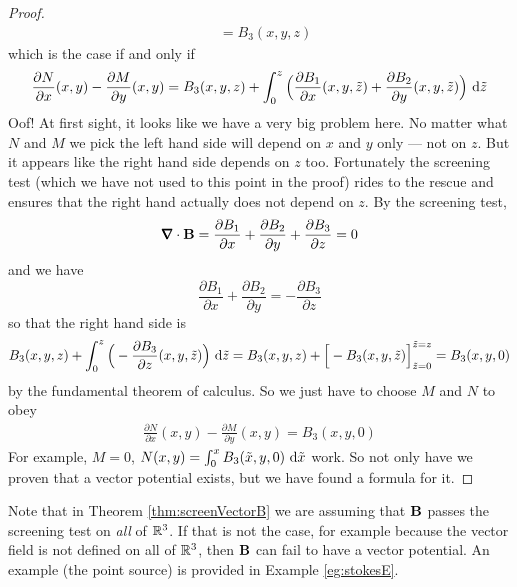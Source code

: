 \begin{proof}
\begin{align*}
&=B_3(x,y,z)
\end{align*}
which is the case if and only if
\begin{align*}
\frac{\partial N}{\partial x}(x,y) -\frac{\partial M}{\partial y}(x,y) =
         B_3(x,y,z) 
         + \int_0^z\Big(\frac{\partial B_1}{\partial x}(x,y,\tilde z) 
         + \frac{\partial B_2}{\partial y}(x,y,\tilde z)\Big)
                            \ \mathrm{d}\tilde z
\end{align*}
Oof! At first sight, it looks like we have a very big problem here.
No matter what $N$ and $M$ we pick the left hand side will depend on $x$ 
and $y$ only --- not on $z$. But it appears like the right hand side
depends on $z$ too. Fortunately the screening test (which we have not used
to this point in the proof) rides to the rescue
and ensures that the right hand actually does not depend on $z$.
By the screening test,
\begin{equation*}
\vnabla\cdot\vB
=\frac{\partial B_1}{\partial x}
+\frac{\partial B_2}{\partial y}
+\frac{\partial B_3}{\partial z}=0
\end{equation*}
and we have
\begin{equation*}
\frac{\partial B_1}{\partial x}
+\frac{\partial B_2}{\partial y}
=-\frac{\partial B_3}{\partial z}
\end{equation*}
so that the right hand side is
\begin{align*}
         B_3(x,y,z) 
        + \int_0^z\Big(-\frac{\partial B_3}{\partial z}(x,y,\tilde z) \Big)
                                        \ \mathrm{d}\tilde z
       = B_3(x,y,z) +\Big[-B_3(x,y,\tilde z)\Big]^{\tilde z=z}_{\tilde z=0}
       =B_3(x,y,0)
\end{align*}
by the fundamental theorem of calculus. So we just have to choose $M$ and $N$ to
obey
\begin{align*}
\frac{\partial N}{\partial x}(x,y) -\frac{\partial M}{\partial y}(x,y) =
         B_3(x,y,0) 
\end{align*}
For example, $M=0$, $N(x,y) = \int _0^x B_3(\tilde x,y,0)\ \dee{\tilde x}$
work. So not only have we proven that a vector potential exists, but we have found a formula for it. 
\end{proof}

\begin{warning}\label{warn:screeningC}
Note that in Theorem \ref{thm:screenVectorB} we are assuming that
$\mathbf{B}$ passes the screening test on \emph{all} of $\mathbb{R}^3$.
If that is not the case, for example
because the vector field is not defined on all of $\mathbb{R}^3$, then 
$\mathbf{B}$ can fail to have a vector potential. An example (the point source)
is provided in Example \ref{eg:stokesE}.
\end{warning}



